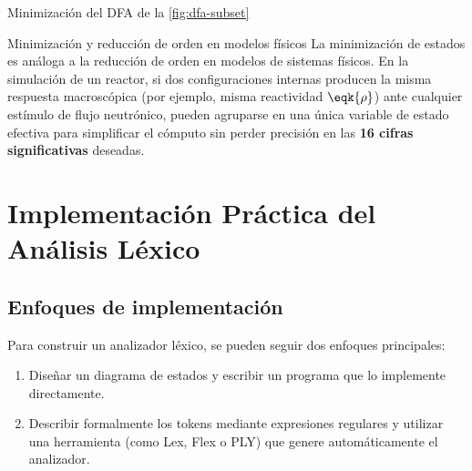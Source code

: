 \begin{ejemplo}{Minimización del DFA de la \cref{fig:dfa-subset}}
\begin{center}
  \label{fig:dfa-minimized}
\end{center}
\end{ejemplo}

\begin{fisicaconexion}{Minimización y reducción de orden en modelos físicos}
La minimización de estados es análoga a la reducción de orden en modelos de sistemas físicos. En la simulación de un reactor, si dos configuraciones internas producen la misma respuesta macroscópica (por ejemplo, misma reactividad $\eqk{\rho}$) ante cualquier estímulo de flujo neutrónico, pueden agruparse en una única variable de estado efectiva para simplificar el cómputo sin perder precisión en las \textbf{16 cifras significativas} deseadas.
\end{fisicaconexion}

\section{Implementación Práctica del Análisis Léxico}
\label{sec:2_6_implementacion}

\subsection{Enfoques de implementación}

Para construir un analizador léxico, se pueden seguir dos enfoques principales:
\begin{enumerate}
    \item Diseñar un diagrama de estados y escribir un programa que lo implemente directamente.
    \item Describir formalmente los tokens mediante expresiones regulares y utilizar una herramienta (como Lex, Flex o PLY) que genere automáticamente el analizador.
\end{enumerate}

